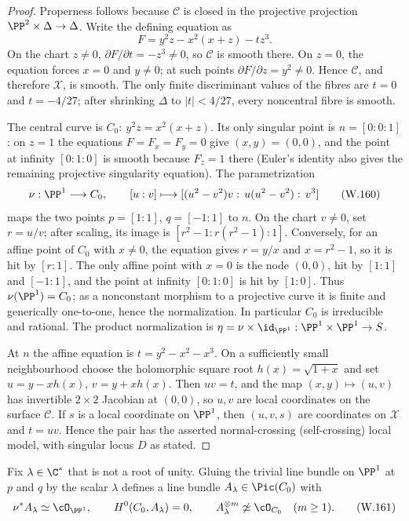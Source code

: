 \begin{proof}
Properness follows because $\mathcal C$ is closed in the projective
projection $\PP^2\times\Delta\to\Delta$.  Write the defining equation as
\[
 F=y^2z-x^2(x+z)-tz^3.
\]
On the chart $z\ne0$, $\partial F/\partial t=-z^3\ne0$, so $\mathcal C$
is smooth there.  On $z=0$, the equation forces $x=0$ and $y\ne0$; at such
points $\partial F/\partial z=y^2\ne0$.  Hence $\mathcal C$, and therefore
$\mathcal X$, is smooth.  The only finite discriminant values of the fibres
are $t=0$ and $t=-4/27$; after shrinking $\Delta$ to $|t|<4/27$, every
noncentral fibre is smooth.

The central curve is
\(C_0:\ y^2z=x^2(x+z)\).  Its only singular point is
\(n=[0:0:1]\): on $z=1$ the equations $F=F_x=F_y=0$ give $(x,y)=(0,0)$,
and the point at infinity $[0:1:0]$ is smooth because $F_z=1$ there
(Euler's identity also gives the remaining projective singularity equation).
The parametrization
\[
 \nu:\PP^1\longrightarrow C_0,\qquad
 [u:v]\longmapsto
 [(u^2-v^2)v:\,u(u^2-v^2):\,v^3]
 \tag{W.160}\label{wbII:eq:CN:4.3}
\]
maps the two points $p=[1:1]$, $q=[-1:1]$ to $n$.  On the chart $v\ne0$, set
$r=u/v$; after scaling, its image is
$[r^2-1:r(r^2-1):1]$.  Conversely, for an affine point of $C_0$ with
$x\ne0$, the equation gives $r=y/x$ and $x=r^2-1$, so it is hit by
$[r:1]$.  The only affine point with $x=0$ is the node $(0,0)$, hit by
$[1:1]$ and $[-1:1]$, and the point at infinity $[0:1:0]$ is hit by
$[1:0]$.  Thus $\nu(\PP^1)=C_0$; as a nonconstant morphism to a projective
curve it is finite and generically one-to-one, hence the normalization.  In
particular $C_0$ is irreducible and rational.  The product normalization
is $\eta=\nu\times\id_{\PP^1}:\PP^1\times\PP^1\to S$.

At $n$ the affine equation is
\(t=y^2-x^2-x^3\).  On a sufficiently small neighbourhood choose the
holomorphic square root $h(x)=\sqrt{1+x}$ and set
\(u=y-xh(x)\), \(v=y+xh(x)\).  Then $uv=t$, and the map
$(x,y)\mapsto(u,v)$ has invertible $2\times2$ Jacobian at $(0,0)$, so $u,v$
are local coordinates on the surface $\mathcal C$.  If $s$ is a local
coordinate on $\PP^1$, then $(u,v,s)$ are coordinates on $\mathcal X$ and
$t=uv$.  Hence the pair has the asserted normal-crossing (self-crossing)
local model, with singular locus $D$ as stated.
\end{proof}

\begin{lemma}
\label{wbII:lem:gluing-bundle}
Fix $\lambda\in\C^*$ that is not a root of unity.  Gluing the trivial line
bundle on $\PP^1$ at $p$ and $q$ by the scalar $\lambda$ defines a line bundle
\(A_\lambda\in\Pic(C_0)\) with
\[
 \nu^*A_\lambda\simeq\cO_{\PP^1},\qquad
 H^0(C_0,A_\lambda)=0,\qquad
 A_\lambda^{\otimes m}\not\simeq\cO_{C_0}\quad(m\ge1).
 \tag{W.161}\label{wbII:eq:CN:4.4}
\]
\end{lemma}

